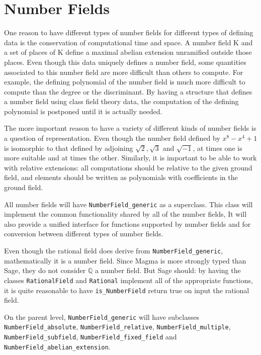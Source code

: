 \documentclass[12pt]{article}
\begin{document}
\section{Number Fields} \label{NF}

One reason to have different types of number fields for different types of defining data is the conservation of computational time and space.  A number field K and a set of places of K define a maximal abelian extension unramified outside those places.  Even though this data uniquely defines a number field, some quantities associated to this number field are more difficult than others to compute.  For example, the defining polynomial of the number field is much more difficult to compute than the degree or the discriminant.  By having a structure that defines a number field using class field theory data, the computation of the defining polynomial is postponed until it is actually needed.

The more important reason to have a variety of different kinds of number fields is a question of representation.  Even though the number field defined by $x^8-x^4+1$ is isomorphic to that defined by adjoining $\sqrt{2}, \sqrt{3}$ and $\sqrt{-1}$, at times one is more suitable and at times the other.  Similarly, it is important to be able to work with relative extensions: all computations should be relative to the given ground field, and elements should be written as polynomials with coefficients in the ground field.

All number fields will have \texttt{NumberField\_generic} as a superclass.  This class will implement the common functionality shared by all of the number fields,  It will also provide a unified interface for functions supported by number fields and for conversion between different types of number fields.

Even though the rational field does derive from \texttt{NumberField\_generic}, mathematically it is a number field.  Since Magma is more strongly typed than Sage, they do not consider $\mathbb{Q}$ a number field.  But Sage should: by having the classes \texttt{RationalField} and \texttt{Rational} implement all of the appropriate functions, it is quite reasonable to have \texttt{is\_NumberField} return true on input the rational field.

On the parent level, \texttt{NumberField\_generic} will have subclasses \texttt{NumberField\_absolute}, \texttt{NumberField\_relative}, \texttt{NumberField\_multiple}, \texttt{NumberField\_subfield}, \texttt{NumberField\_fixed\_field} and \texttt{NumberField\_abelian\_extension}.
\end{document}
